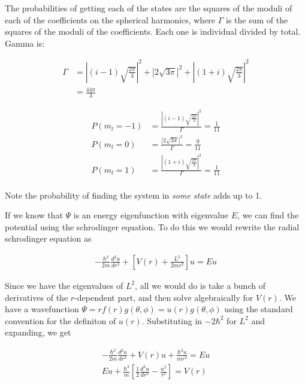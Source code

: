 \documentclass[paper=a4, fontsize=11pt]{scrartcl} %
\numberwithin{equation}{section} %
\numberwithin{figure}{section} %
\numberwithin{table}{section} %
\begin{document}
The probabilities of getting each of the states are the squares of the moduli of each of the coefficients on the spherical harmonics, where $\Gamma$ is the sum of the squares of the moduli of the coefficients. Each one is individual divided by total. Gamma is:

\begin{align}
\Gamma &= \left|(i - 1)\sqrt{\frac{2 \pi}{3}}\right|^2 + \left|2 \sqrt{3 \pi}\right|^2 + \left|(1 + i)\sqrt{\frac{2 \pi}{3}}\right|^2 \\ 
&= \frac{44 \pi}{3} 
\end{align}

\begin{align}
P(m_l = -1) &= \frac{\left|(i - 1)\sqrt{\frac{2 \pi}{3}}\right|^2}{\Gamma} = \frac{1}{11} \\
P(m_l = 0) &= \frac{\left|2 \sqrt{3 \pi}\right|^2}{\Gamma} = \frac{9}{11}\\
P(m_l = 1) &= \frac{\left|(1 + i)\sqrt{\frac{2 \pi}{3}}\right|^2}{\Gamma} = \frac{1}{11} \\
\end{align}

Note the probability of finding the system in \textit{some state} adds up to 1.

\hspace{2mm}

If we know that $\Psi$ is an energy eigenfunction with eigenvalue $E$, we can find the potential using the schrodinger equation. To do this we would rewrite the radial schrodinger equation as 

\begin{align}
-\frac{\hbar^2}{2m}\frac{d^2 u}{dr^2} + \left[V(r) + \frac{L^2}{2m r^2}\right]u = Eu
\end{align}

Since we have the eigenvalues of $L^2$, all we would do is take a bunch of derivatives of the $r$-dependent part, and then solve algebraically for $V(r)$. We have a wavefunction $\Psi = rf(r)g(\theta,\phi) = u(r)g(\theta,\phi)$ using the standard convention for the definiton of $u(r)$. Substituting in $-2\hbar^2$ for $L^2$ and expanding, we get

\begin{align}
-\frac{\hbar^2}{2m}\frac{d^2 u }{dr^2} + V(r)u + \frac{\hbar^2 u }{m r^2} = E u \\  
E u + \frac{\hbar^2}{m}\left[\frac{1}{2}\frac{d^2 u}{dr^2}  -\frac{u^2}{r^2}\right] = V(r)
\end{align}
\end{document}
